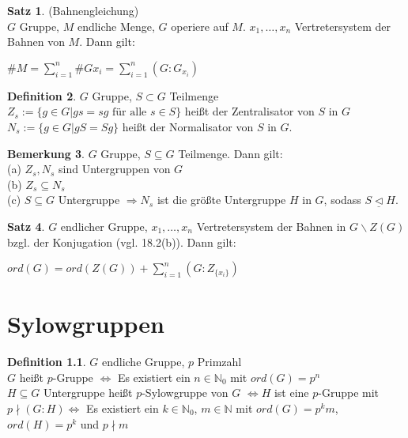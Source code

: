 \documentclass[10pt,a4paper,numbers=endperiod]{scrreprt}
\theoremstyle{definition}
\newtheorem{satz}{Satz}[section]
\newtheorem{defi}[satz]{Definition}
\newtheorem{bem}[satz]{Bemerkung}
\def\NN{{\mathbb N}}
\begin{document}
\begin{satz}
	(Bahnengleichung)\\
	$G$ Gruppe, $M$ endliche Menge, $G$ operiere auf $M$. $x_1, \ldots, x_n$ Vertretersystem der Bahnen von $M$. Dann gilt:
	\begin{center}
		$\# M = \sum\limits_{i = 1}^n \# Gx_i = \sum\limits_{i = 1}^n (G:G_{x_i})$
	\end{center}
\end{satz}

\begin{defi}
	$G$ Gruppe, $S \subset G$ Teilmenge\\
	$Z_s := \{g \in G| gs = sg \text{ für alle } s \in S\}$ heißt der Zentralisator von $S$ in $G$\\
	$N_s := \{g \in G| gS = Sg\}$ heißt der Normalisator von $S$ in $G$.
\end{defi}

\begin{bem}
	$G$ Gruppe, $S \subseteq G$ Teilmenge. Dann gilt:\\
	(a) $Z_s, N_s$ sind Untergruppen von $G$\\
	(b) $Z_s \subseteq N_s$\\
	(c) $S \subseteq G$ Untergruppe $\Rightarrow N_s$ ist die größte Untergruppe $H$ in $G$, sodass $S \underline{\vartriangleleft} H$.
\end{bem}

\begin{satz}
	$G$ endlicher Gruppe, $x_1, \ldots, x_n$ Vertretersystem der Bahnen in $G \backslash Z(G)$ bzgl. der Konjugation (vgl. 18.2(b)). Dann gilt:\\
	\begin{center}
		$ord(G) = ord(Z(G)) + \sum\limits_{i = 1}^n (G: Z_{\{x_i\}})$ 
	\end{center}
\end{satz}

\chapter{Sylowgruppen} 

\begin{defi}
	$G$ endliche Gruppe, $p$ Primzahl\\
	$G$ heißt $p$-Gruppe $\Leftrightarrow$ Es existiert ein $n \in \NN_0$ mit $ord(G) = p^n$\\
	$H \subseteq G$ Untergruppe heißt $p$-Sylowgruppe von $G$ $\Leftrightarrow H$ ist eine $p$-Gruppe mit $p \nmid (G:H) \Leftrightarrow$ Es existiert ein $k \in \NN_0$, $m \in \NN$ mit $ord(G) = p^km$, $ord(H) = p^k$ und $p \nmid m$
\end{defi}
\end{document}
